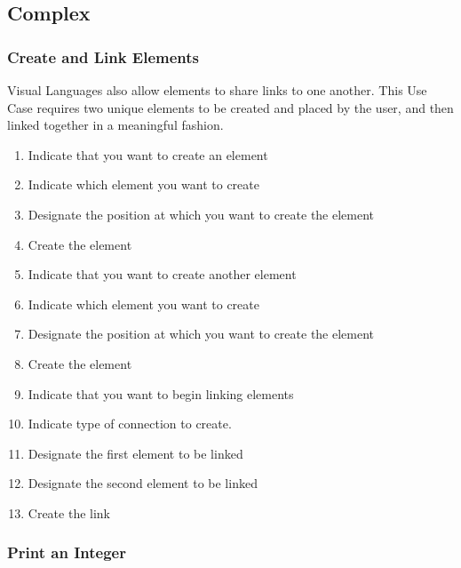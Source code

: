 \subsection{Complex}
\label{app:complex_euc}

\subsubsection{Create and Link Elements}
\label{app:euc_create_link}

Visual Languages also allow elements to share links to one another. This
Use Case requires two unique elements to be created and placed by the user,
and then linked together in a meaningful fashion.

\begin{enumerate}
  \item Indicate that you want to create an element
  \item Indicate which element you want to create
  \item Designate the position at which you want to create the element
  \item Create the element
  \item Indicate that you want to create another element
  \item Indicate which element you want to create
  \item Designate the position at which you want to create the element
  \item Create the element
  \item Indicate that you want to begin linking elements
  \item Indicate type of connection to create.
  \item Designate the first element to be linked
  \item Designate the second element to be linked
  \item Create the link
\end{enumerate}

\subsubsection{Print an Integer}
\label{app:euc_print_integer}

